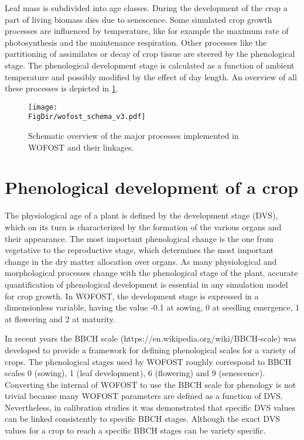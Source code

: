 Leaf mass is subdivided into age classes. During the development of the crop a part of
living biomass dies due to senescence. Some simulated crop growth processes are
influenced by temperature, like for example the maximum rate of photosynthesis and the
maintenance respiration. Other processes like the partitioning of assimilates or decay of
crop tissue are steered by the phenological stage. The phenological development stage is
calculated as a function of ambient temperature and possibly modified by the effect of day
length. An overview of all these processes is depicted in \ref{fig:CropGrowthProc2}.

\begin{figure}[p]
	\centering
	\texttt{[image: \\FigDir/wofost\_schema\_v3.pdf]}
	\caption{Schematic overview of the major processes implemented in WOFOST and their linkages.}
	\label{fig:CropGrowthProc2}
\end{figure}

\section{Phenological development of a crop}

The physiological age of a plant is defined by the development stage (DVS), which on its turn is
characterized by the formation of the various organs and their appearance. The most
important phenological change is the one from vegetative to the reproductive stage, which
determines the most important change in the dry matter allocation over organs. As many
physiological and morphological processes change with the phenological stage of the
plant, accurate quantification of phenological development is essential in any simulation
model for crop growth. In WOFOST, the development stage is expressed in a dimensionless variable, 
having the value -0.1 at sowing, 0 at seedling emergence, 1 at flowering and 2 at maturity. 

In recent years the BBCH scale (https://en.wikipedia.org/wiki/BBCH-scale) was developed to provide 
a framework for defining phenological scales for a variety of crops. The phenological stages
used by WOFOST roughly correspond to BBCH scales 0 (sowing), 1 (leaf development), 6 (flowering)
and 9 (senescence). Converting the internal of WOFOST to use the BBCH scale for phenology is 
not trivial because many WOFOST parameters are defined as a function of DVS. Nevertheless,
in calibration studies it was demonstrated that specific DVS values can be linked consistently
to specific BBCH stages. Although the exact DVS values for a crop to reach a specific BBCH
stages can be variety specific.


